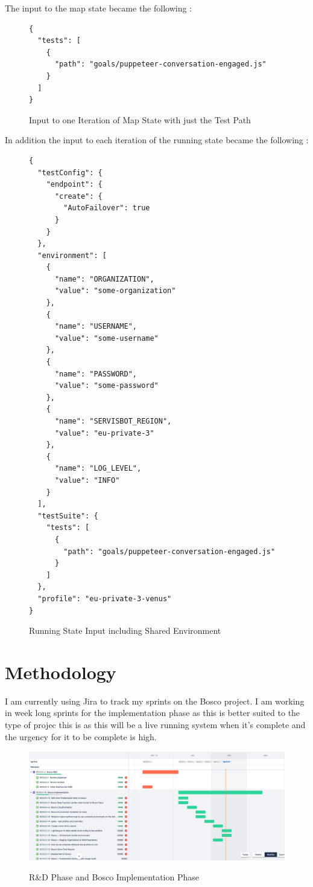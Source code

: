 \documentclass[12pt,a4paper,titlepage]{report}
\begin{document}
The input to the map state became the following :

\begin{figure}[H]
  \begin{tcolorbox}
    \begin{verbatim}
{
  "tests": [
    {
      "path": "goals/puppeteer-conversation-engaged.js"
    }
  ]
}
\end{verbatim}
  \end{tcolorbox}
  \caption{Input to one Iteration of Map State with just the Test Path}
\end{figure}

In addition the input to each iteration of the running state became the following :

\begin{figure}[H]
  \begin{tcolorbox}
    \begin{verbatim}
{
  "testConfig": {
    "endpoint": {
      "create": {
        "AutoFailover": true
      }
    }
  },
  "environment": [
    {
      "name": "ORGANIZATION",
      "value": "some-organization"
    },
    {
      "name": "USERNAME",
      "value": "some-username"
    },
    {
      "name": "PASSWORD",
      "value": "some-password"
    },
    {
      "name": "SERVISBOT_REGION",
      "value": "eu-private-3"
    },
    {
      "name": "LOG_LEVEL",
      "value": "INFO"
    }
  ],
  "testSuite": {
    "tests": [
      {
        "path": "goals/puppeteer-conversation-engaged.js"
      }
    ]
  },
  "profile": "eu-private-3-venus"
}

\end{verbatim}
  \end{tcolorbox}
  \caption{Running State Input including Shared Environment}
\end{figure}

\secton

\appendix
\chapter{Methodology}
I am currently using Jira to track my sprints on the Bosco project. I am working in week long sprints for the implementation phase as this
is better suited to the type of projec this is as this will be a live running system when it's complete and the urgency for it to be complete is high.

\begin{figure}[ht]
  \centering
  {\includegraphics[width=15cm]{./diagrams/sprints1.png}}
  \caption{R\&D Phase and Bosco Implementation Phase}
\end{figure}
\end{document}
